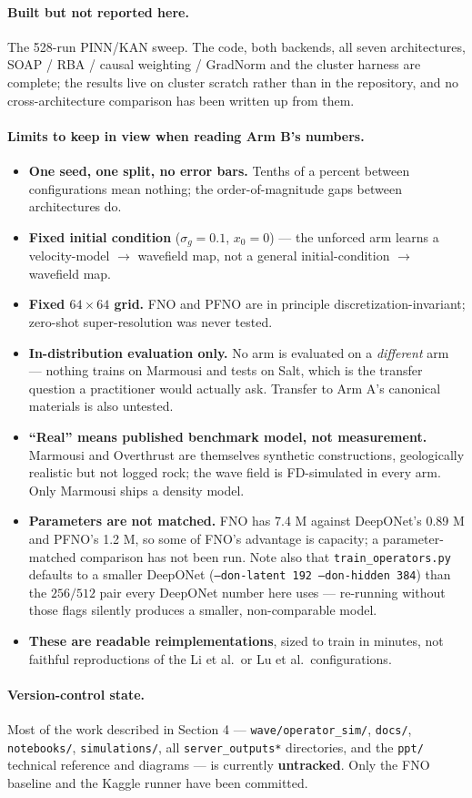 \documentclass[11pt,a4paper]{article}
\begin{document}
\paragraph{Built but not reported here.} The 528-run PINN/KAN sweep. The code,
both backends, all seven architectures, SOAP / RBA / causal weighting / GradNorm
and the cluster harness are complete; the results live on cluster scratch rather
than in the repository, and no cross-architecture comparison has been written up
from them.

\paragraph{Limits to keep in view when reading Arm B's numbers.}
\begin{itemize}[leftmargin=*,itemsep=3pt]
\item \textbf{One seed, one split, no error bars.} Tenths of a percent between
configurations mean nothing; the order-of-magnitude gaps between architectures
do.
\item \textbf{Fixed initial condition} ($\sigma_g=0.1$, $x_0=0$) --- the unforced
arm learns a velocity-model $\to$ wavefield map, not a general initial-condition
$\to$ wavefield map.
\item \textbf{Fixed $64\times64$ grid.} FNO and PFNO are in principle
discretization-invariant; zero-shot super-resolution was never tested.
\item \textbf{In-distribution evaluation only.} No arm is evaluated on a
\emph{different} arm --- nothing trains on Marmousi and tests on Salt, which is
the transfer question a practitioner would actually ask. Transfer to Arm A's
canonical materials is also untested.
\item \textbf{``Real'' means published benchmark model, not measurement.}
Marmousi and Overthrust are themselves synthetic constructions, geologically
realistic but not logged rock; the wave field is FD-simulated in every arm. Only
Marmousi ships a density model.
\item \textbf{Parameters are not matched.} FNO has 7.4 M against DeepONet's
0.89 M and PFNO's 1.2 M, so some of FNO's advantage is capacity; a
parameter-matched comparison has not been run. Note also that
\texttt{train\_operators.py} defaults to a smaller DeepONet
(\texttt{--don-latent 192 --don-hidden 384}) than the $256/512$ pair every
DeepONet number here uses --- re-running without those flags silently produces a
smaller, non-comparable model.
\item \textbf{These are readable reimplementations}, sized to train in minutes,
not faithful reproductions of the Li et al.\ or Lu et al.\ configurations.
\end{itemize}

\paragraph{Version-control state.} Most of the work described in Section 4 ---
\texttt{wave/operator\_sim/}, \texttt{docs/}, \texttt{notebooks/},
\texttt{simulations/}, all \texttt{server\_outputs*} directories, and the
\texttt{ppt/} technical reference and diagrams --- is currently
\textbf{untracked}. Only the FNO baseline and the Kaggle runner have been
committed.
\end{document}
